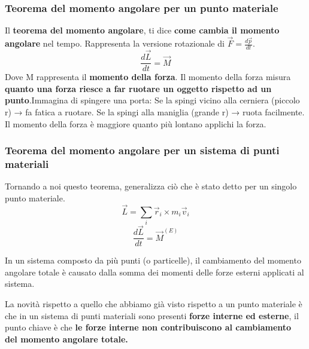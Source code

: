 \documentclass{article}
\numberwithin{equation}{subsection}
\begin{document}
\subsubsection{Teorema del momento angolare per un punto materiale}
Il \textbf{teorema del momento angolare}, ti dice \textbf{come cambia il momento angolare} nel tempo. Rappresenta la versione rotazionale di $\vec{F}=\frac{d\vec{p}}{dt}$. 
\begin{equation}
    \frac{d\vec{L}}{dt}=\vec{M}
\end{equation}
Dove M rappresenta il \textbf{momento della forza}. Il momento della forza misura \textbf{quanto una forza riesce a far ruotare un oggetto rispetto ad un punto}.Immagina di spingere una porta: Se la spingi vicino alla cerniera (piccolo r) → fa fatica a ruotare. Se la spingi alla maniglia (grande r) → ruota facilmente. Il momento della forza è maggiore quanto più lontano applichi la forza.
\newpage
\subsubsection{Teorema del momento angolare per un sistema di punti materiali}
Tornando a noi questo teorema, generalizza ciò che è stato detto per un singolo punto materiale.
\begin{equation}
    \vec{L}=\sum_i\vec{r}_i \times m_i\vec{v}_i
\end{equation}
\begin{equation}
    \frac{d\vec{L}}{dt}=\vec{M}^{(E)}
\end{equation}
\begin{shaded}
In un sistema composto da più punti (o particelle), il cambiamento del momento angolare totale è causato dalla somma dei momenti delle forze esterni applicati al sistema.
\end{shaded}
La novità rispetto a quello che abbiamo già visto rispetto a un punto materiale è che in un sistema di punti materiali sono presenti \textbf{forze interne ed esterne}, il punto chiave è che \textbf{le forze interne non contribuiscono al cambiamento del momento angolare totale.} 
\end{document}
